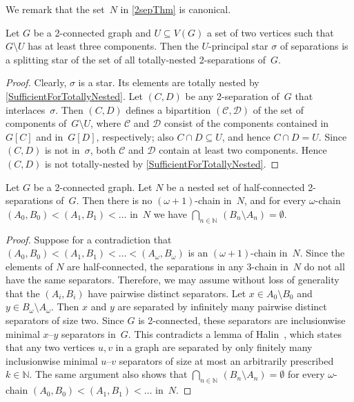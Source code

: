 \documentclass{aic}
\newcommand{\se}{\subseteq}
\newcommand{\N}{\mathbb{N}}
\newcommand{\cC}{\mathscr{C}}
\newcommand{\cD}{\mathscr{D}}
\theoremstyle{plain}
\theoremstyle{definition}
\theoremstyle{plain}
\theoremstyle{plain}
\newcommand{\sm}{\setminus}
\begin{document}
We remark that the set~$N$ in \autoref{2sepThm} is canonical.


\begin{lem}\label{3compsEnsuresTotallyNested}
Let $G$ be a 2-connected graph and $U\se V(G)$ a set of two vertices such that $G\sm U$ has at least three components.
Then the $U$-principal star $\sigma$ of separations is a splitting star of the set of all totally-nested 2-separations of~$G$.
\end{lem}
\begin{proof}
Clearly, $\sigma$ is a star.
Its elements are totally nested by \autoref{SufficientForTotallyNested}.
Let $(C,D)$ be any 2-separation of~$G$ that interlaces~$\sigma$.
Then $(C,D)$ defines a bipartition $(\cC,\cD)$ of the set of components of~$G\sm U$, where $\cC$ and $\cD$ consist of the components contained in $G[C]$ and in~$G[D]$, respectively; also $C\cap D\se U$, and hence $C\cap D=U$.
Since $(C,D)$ is not in~$\sigma$, both $\cC$ and $\cD$ contain at least two components.
Hence $(C,D)$ is not totally-nested by \autoref{SufficientForTotallyNested}.
\end{proof}

\begin{lem}\label{TDCvsNested}
Let $G$ be a 2-connected graph.
Let $N$ be a nested set of half-connected 2-separations of~$G$.
Then there is no $(\omega+1)$-chain in~$N$, and for every $\omega$-chain $(A_0,B_0)<(A_1,B_1)<\ldots$ in~$N$ we have $\bigcap_{n\in\N}\,(B_n\sm A_n)=\emptyset$.
\end{lem}

\begin{proof}
Suppose for a contradiction that $(A_0,B_0)<(A_1,B_1)<\ldots<(A_\omega,B_\omega)$ is an $(\omega+1)$-chain in~$N$.
Since the elements of $N$ are half-connected, the separations in any 3-chain in~$N$ do not all have the same separators.
Therefore, we may assume without loss of generality that the $(A_i,B_i)$ have pairwise distinct separators.
Let $x\in A_0\sm B_0$ and $y\in B_\omega\sm A_\omega$.
Then $x$ and $y$ are separated by infinitely many pairwise distinct separators of size two.
Since $G$ is 2-connected, these separators are inclusionwise minimal $x$--$y$ separators in~$G$.
This contradicts a lemma of Halin~\cite[2.4]{HalinMinimal}, which states that any two vertices $u,v$ in a graph are separated by only finitely many inclusionwise minimal $u$--$v$ separators of size at most an arbitrarily prescribed~$k\in\N$.
The same argument also shows that $\bigcap_{n\in\N}\,(B_n\sm A_n)=\emptyset$ for every $\omega$-chain $(A_0,B_0)<(A_1,B_1)<\ldots$ in~$N$.
\end{proof}
\end{document}
